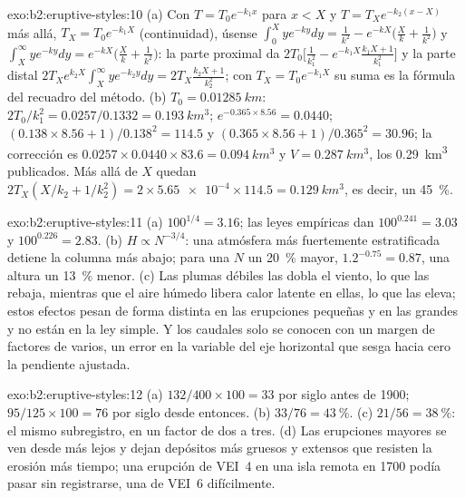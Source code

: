 \begin{solution}{exo:b2:eruptive-styles:10}
(a) Con $T = T_0e^{-k_1x}$ para $x < X$ y $T = T_Xe^{-k_2(x - X)}$ más allá, $T_X =
T_0e^{-k_1X}$ (continuidad), úsense $\int_0^X ye^{-ky}dy = \frac{1}{k^2} - e^{-kX}\big(\frac{X}{k} +
\frac{1}{k^2}\big)$ y $\int_X^\infty ye^{-ky}dy = e^{-kX}\big(\frac{X}{k} +
\frac{1}{k^2}\big)$:
la parte proximal da $2T_0\big[\frac{1}{k_1^2} - e^{-k_1X}\frac{k_1X + 1}{k_1^2}\big]$ y la
parte distal $2T_Xe^{k_2X}\int_X^\infty ye^{-k_2y}dy = 2T_X\frac{k_2X + 1}{k_2^2}$; con $T_X =
T_0e^{-k_1X}$ su suma es la fórmula del recuadro del método.
(b) $T_0 = \qty{0.01285}{km}$: $2T_0/k_1^2 = 0.0257/0.1332 = \qty{0.193}{km^3}$;
$e^{-0.365\times8.56} = 0.0440$; $(0.138\times8.56 + 1)/0.138^2 = 114.5$ y
$(0.365\times8.56 + 1)/0.365^2 = 30.96$; la corrección es $0.0257\times0.0440\times83.6
= \qty{0.094}{km^3}$ y $V = \qty{0.287}{km^3}$, los \qty{0.29}{km^3} publicados.
Más allá de $X$ quedan $2T_X(X/k_2 + 1/k_2^2) = 2\times\num{5.65e-4}\times114.5 =
\qty{0.129}{km^3}$, es decir, un \qty{45}{\percent}.
\end{solution}

\begin{solution}{exo:b2:eruptive-styles:11}
(a) $100^{1/4} = 3.16$; las leyes empíricas dan $100^{0.241} = 3.03$ y
$100^{0.226} = 2.83$. (b) $H \propto N^{-3/4}$: una atmósfera más fuertemente estratificada
detiene la columna más abajo; para una $N$ un \qty{20}{\percent} mayor,
$1.2^{-0.75} = 0.87$, una altura un \qty{13}{\percent} menor. (c) Las plumas débiles las
dobla el viento, lo que las rebaja, mientras que el aire húmedo libera calor latente en
ellas, lo que las eleva; estos efectos pesan de forma distinta en las erupciones pequeñas y en las grandes
y no están en la ley simple. Y los caudales solo se conocen con un margen de
factores de varios, un error en la variable del eje horizontal que sesga
hacia cero la pendiente ajustada.
\end{solution}

\begin{solution}{exo:b2:eruptive-styles:12}
(a) $132/400\times100 = 33$ por siglo antes de 1900; $95/125\times100 = 76$ por
siglo desde entonces. (b) $33/76 = \qty{43}{\percent}$. (c) $21/56 = \qty{38}{\percent}$:
el mismo subregistro, en un factor de dos a tres. (d) Las erupciones mayores se
ven desde más lejos y dejan depósitos más gruesos y extensos que resisten la erosión
más tiempo; una erupción de VEI~4 en una isla remota en 1700 podía pasar sin registrarse, una
de VEI~6 difícilmente.
\end{solution}

